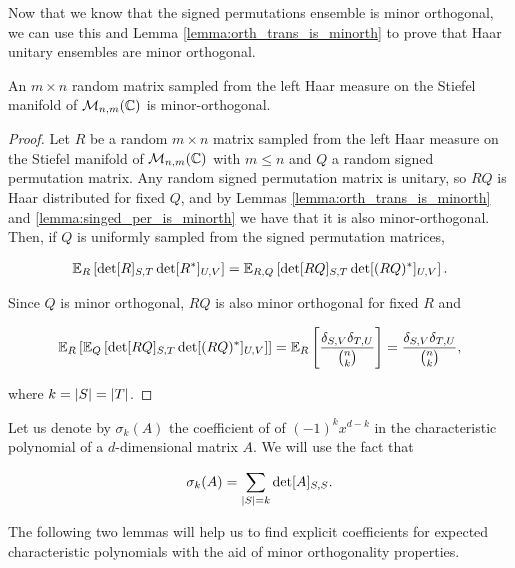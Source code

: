 Now that we know that the signed permutations ensemble is minor orthogonal, we can use this and Lemma \ref{lemma:orth_trans_is_minorth} to prove that Haar unitary ensembles are minor orthogonal.


\begin{corollary}
    An $m\times n$ random matrix sampled from the left Haar measure on the Stiefel manifold of $\mathcal M_{n,m}(\mathbb C)$ is minor-orthogonal.
\end{corollary}

\begin{proof}
    Let $R$ be a random $m\times n$ matrix sampled from the left Haar measure on the Stiefel manifold of $\mathcal M_{n,m}(\mathbb C)$ with $m \le n$ and $Q$ a random signed permutation matrix. Any random signed permutation matrix is unitary, so $RQ$ is Haar distributed for fixed $Q$, and by Lemmas \ref{lemma:orth_trans_is_minorth} and \ref{lemma:singed_per_is_minorth} we have that it is also minor-orthogonal. Then, if $Q$ is uniformly sampled from the signed permutation matrices,

    \begin{align*}
        \mathbb E_R\left[ \det[R]_{S,T}\det[R^*]_{U,V} \right] = \mathbb E_{R,Q}\left[ \det[RQ]_{S,T} \det[(RQ)^*]_{U,V}\right]. 
    \end{align*}

    Since $Q$ is minor orthogonal, $RQ$ is also minor orthogonal for fixed $R$ and 

    \begin{align*}
        \mathbb E_R\left[ \mathbb E_Q \left[ \det[RQ]_{S,T}\det[(RQ)^*]_{U,V} \right] \right] = \mathbb E_R\left[ \frac{\delta_{S,V}\delta_{T,U}}{\binom{n}{k}}\right] = \frac{\delta_{S,V}\delta_{T,U}}{\binom{n}{k}},
    \end{align*}

    \noindent where $k = \lvert S \rvert = \lvert T \rvert$. 
\end{proof}




Let us denote by $\sigma_k(A)$ the coefficient of of $(-1)^{k}x^{d-k}$ in the characteristic polynomial of a $d$-dimensional matrix $A$. We will use the fact that 

\begin{equation*}
    \sigma_k(A) = \sum_{\lvert S \rvert = k} \det[A]_{S,S}.
\end{equation*}

The following two lemmas will help us to find explicit coefficients for expected characteristic polynomials with the aid of minor orthogonality properties.

